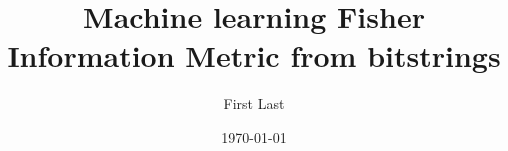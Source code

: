 \documentclass{revtex4-2}
\begin{document}
\title{Machine learning Fisher Information Metric from bitstrings}
\author{First Last}

\date{\today}



\end{document}
